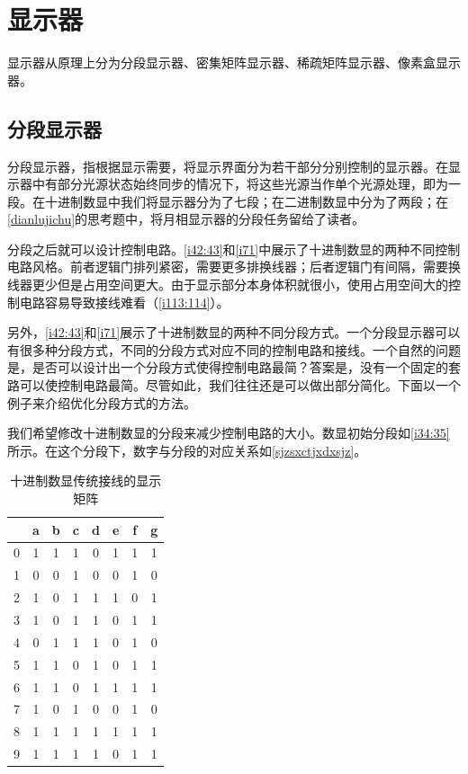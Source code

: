 \section{显示器}
显示器从原理上分为分段显示器、密集矩阵显示器、稀疏矩阵显示器、像素盒显示器。

\subsection{分段显示器}
分段显示器，指根据显示需要，将显示界面分为若干部分分别控制的显示器。在显示器中有部分光源状态始终同步的情况下，将这些光源当作单个光源处理，即为一段。在十进制数显中我们将显示器分为了七段；在二进制数显中分为了两段；在\autoref{dianlujichu}的思考题中，将月相显示器的分段任务留给了读者。

分段之后就可以设计控制电路。\autoref{i42:43}和\autoref{i71}中展示了十进制数显的两种不同控制电路风格。前者逻辑门排列紧密，需要更多排换线器；后者逻辑门有间隔，需要换线器更少但是占用空间更大。由于显示部分本身体积就很小，使用占用空间大的控制电路容易导致接线难看（\autoref{i113:114}）。

另外，\autoref{i42:43}和\autoref{i71}展示了十进制数显的两种不同分段方式。一个分段显示器可以有很多种分段方式，不同的分段方式对应不同的控制电路和接线。一个自然的问题是，是否可以设计出一个分段方式使得控制电路最简？答案是，没有一个固定的套路可以使控制电路最简。尽管如此，我们往往还是可以做出部分简化。下面以一个例子来介绍优化分段方式的方法。

我们希望修改十进制数显的分段来减少控制电路的大小。数显初始分段如\autoref{i34:35}所示。在这个分段下，数字与分段的对应关系如\autoref{sjzsxctjxdxsjz}。

\begin{table}[!h]
\centering
\begin{tabular}{c|ccccccc}
&a&b&c&d&e&f&g\\\hline
0&1&1&1&0&1&1&1\\
1&0&0&1&0&0&1&0\\
2&1&0&1&1&1&0&1\\
3&1&0&1&1&0&1&1\\
4&0&1&1&1&0&1&0\\
5&1&1&0&1&0&1&1\\
6&1&1&0&1&1&1&1\\
7&1&0&1&0&0&1&0\\
8&1&1&1&1&1&1&1\\
9&1&1&1&1&0&1&1
\end{tabular}
\caption{十进制数显传统接线的显示矩阵}\label{sjzsxctjxdxsjz}
\end{table}

